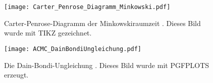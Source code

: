 \lipsum[2]

\begin{figure}[ht!]
\centering
\texttt{[image: Carter\_Penrose\_Diagramm\_Minkowski.pdf]}
\caption{Carter-Penrose-Diagramm der Minkowskiraumzeit \cite{Penrose:1965}. Dieses Bild wurde mit TIKZ gezeichnet.}
\label{fig:CarterPenrose_Minkowski}
\end{figure}

\lipsum[3]

\begin{figure}[ht!]
\centering
\texttt{[image: ACMC\_DainBondiUngleichung.pdf]}
\caption{Die Dain-Bondi-Ungleichung \cite{Schinkel:2013}. Dieses Bild wurde mit PGFPLOTS erzeugt.}
\label{fig:Expansionen_Schwarzschild}
\end{figure}

\lipsum[5]